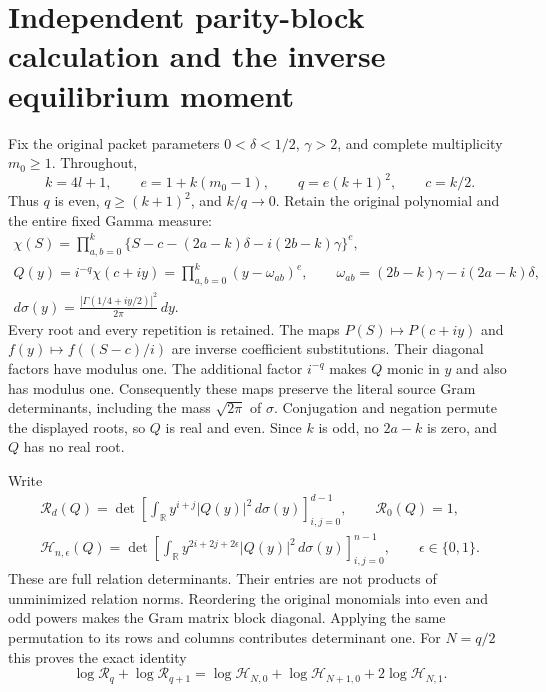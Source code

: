 \section{Independent parity-block calculation and the inverse equilibrium moment}
\label{sec:igb-independent-parity}

Fix the original packet parameters $0<\delta<1/2$, $\gamma>2$,
and complete multiplicity $m_0\geq1$. Throughout,
\[
 k=4l+1,\qquad e=1+k(m_0-1),\qquad q=e(k+1)^2,\qquad c=k/2.
 \tag{IGB1}
\]
Thus $q$ is even, $q\geq(k+1)^2$, and $k/q\to0$.
Retain the original polynomial and the entire fixed Gamma measure:
\[
 \begin{gathered}
 \chi(S)=\prod_{a,b=0}^k
 \{S-c-(2a-k)\delta-i(2b-k)\gamma\}^{e},\\
 Q(y)=i^{-q}\chi(c+iy)
 =\prod_{a,b=0}^k(y-\omega_{ab})^e,\qquad
 \omega_{ab}=(2b-k)\gamma-i(2a-k)\delta,\\
 d\sigma(y)=\frac{|\Gamma(1/4+iy/2)|^2}{2\pi}\,dy .
 \end{gathered}\tag{IGB2}
\]
Every root and every repetition is retained. The maps
$P(S)\mapsto P(c+iy)$ and $f(y)\mapsto f((S-c)/i)$ are inverse
coefficient substitutions. Their diagonal factors have modulus one.
The additional factor $i^{-q}$ makes $Q$ monic in $y$ and also has
modulus one. Consequently these maps preserve the literal source
Gram determinants, including the mass $\sqrt{2\pi}$ of $\sigma$.
Conjugation and negation permute the displayed roots, so $Q$ is real
and even. Since $k$ is odd, no $2a-k$ is zero, and $Q$ has no real root.

Write
\[
 \begin{gathered}
 \mathcal R_d(Q)=
 \det\left[\int_{\mathbb R}y^{i+j}|Q(y)|^2\,d\sigma(y)\right]_{i,j=0}^{d-1},
 \qquad \mathcal R_0(Q)=1,\\
 \mathcal H_{n,\epsilon}(Q)=
 \det\left[\int_{\mathbb R}
 y^{2i+2j+2\epsilon}|Q(y)|^2\,d\sigma(y)\right]_{i,j=0}^{n-1},
 \qquad \epsilon\in\{0,1\}.
 \end{gathered}\tag{IGB3}
\]
These are full relation determinants. Their entries are not products
of unminimized relation norms. Reordering the original monomials into
even and odd powers makes the Gram matrix block diagonal. Applying
the same permutation to its rows and columns contributes determinant
one. For $N=q/2$ this proves the exact identity
\[
 \log\mathcal R_q+\log\mathcal R_{q+1}
 =\log\mathcal H_{N,0}+
   \log\mathcal H_{N+1,0}+2\log\mathcal H_{N,1}.
 \tag{IGB4}
\]

